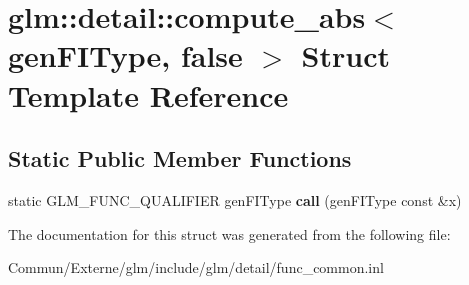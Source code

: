 \hypertarget{structglm_1_1detail_1_1compute__abs_3_01gen_f_i_type_00_01false_01_4}{}\section{glm\+:\+:detail\+:\+:compute\+\_\+abs$<$ gen\+F\+I\+Type, false $>$ Struct Template Reference}
\label{structglm_1_1detail_1_1compute__abs_3_01gen_f_i_type_00_01false_01_4}
\subsection*{Static Public Member Functions}
\begin{DoxyCompactItemize}
\item 
static G\+L\+M\+\_\+\+F\+U\+N\+C\+\_\+\+Q\+U\+A\+L\+I\+F\+I\+ER gen\+F\+I\+Type {\bfseries call} (gen\+F\+I\+Type const \&x)\hypertarget{structglm_1_1detail_1_1compute__abs_3_01gen_f_i_type_00_01false_01_4_a0758b7608495285101dea21f0a7cc37a}{}\label{structglm_1_1detail_1_1compute__abs_3_01gen_f_i_type_00_01false_01_4_a0758b7608495285101dea21f0a7cc37a}

\end{DoxyCompactItemize}


The documentation for this struct was generated from the following file\+:\begin{DoxyCompactItemize}
\item 
Commun/\+Externe/glm/include/glm/detail/func\+\_\+common.\+inl\end{DoxyCompactItemize}
